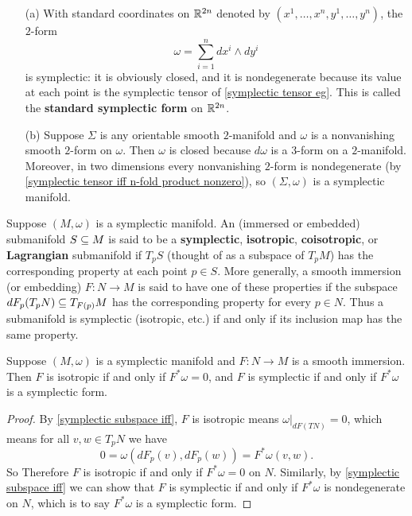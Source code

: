 \begin{example}
\mbox{}
\begin{enumerate}
\item[(a)] With standard coordinates on $\mathbb{R}^{2n}$ denoted by $(x^1,\dots,x^n,y^1,\dots,y^n)$, the $2$-form
\[\omega=\sum_{i=1}^{n}dx^i\wedge dy^i\]
is symplectic: it is obviously closed, and it is nondegenerate because its value at each point is the symplectic tensor of \cref{symplectic tensor eg}. This is called the \textbf{standard symplectic form} on $\mathbb{R}^{2n}$.
\item[(b)] Suppose $\Sigma$ is any orientable smooth $2$-manifold and $\omega$ is a nonvanishing smooth $2$-form on $\omega$. Then $\omega$ is closed because $d\omega$ is a $3$-form on a $2$-manifold.
Moreover, in two dimensions every nonvanishing $2$-form is nondegenerate (by \cref{symplectic tensor iff n-fold product nonzero}), so $(\Sigma,\omega)$ is a symplectic manifold.
\end{enumerate}
\end{example}

Suppose $(M,\omega)$ is a symplectic manifold. An (immersed or embedded) submanifold $S\subseteq M$ is said to be a \textbf{symplectic}, \textbf{isotropic}, \textbf{coisotropic}, or \textbf{Lagrangian} submanifold if $T_pS$ (thought of as a subspace of $T_pM$) has the corresponding property at each point $p\in S$. More generally, a smooth immersion (or embedding) $F:N\to M$ is said to have one of these properties if the subspace $dF_p(T_pN)\subseteq T_{F(p)}M$ has the corresponding property for every $p\in N$. Thus a submanifold is symplectic (isotropic, etc.) if and only if its inclusion map has the same property.

\begin{proposition}\label{symplectic isotropic map iff pullback}
Suppose $(M,\omega)$ is a symplectic manifold and $F:N\to M$ is a smooth immersion. Then $F$ is isotropic if and only if $F^*\omega=0$, and $F$ is symplectic if and only if $F^*\omega$ is a symplectic form.
\end{proposition}
\begin{proof}
By \cref{symplectic subspace iff}, $F$ is isotropic means $\omega|_{dF(TN)}=0$, which means for all $v,w\in T_pN$ we have
\[0=\omega(dF_p(v),dF_p(w))=F^*\omega(v,w).\]
So Therefore $F$ is isotropic if and only if $F^*\omega=0$ on $N$. Similarly, by \cref{symplectic subspace iff} we can show that $F$ is symplectic if and only if $F^*\omega$ is nondegenerate on $N$, which is to say $F^*\omega$ is a symplectic form.
\end{proof}


